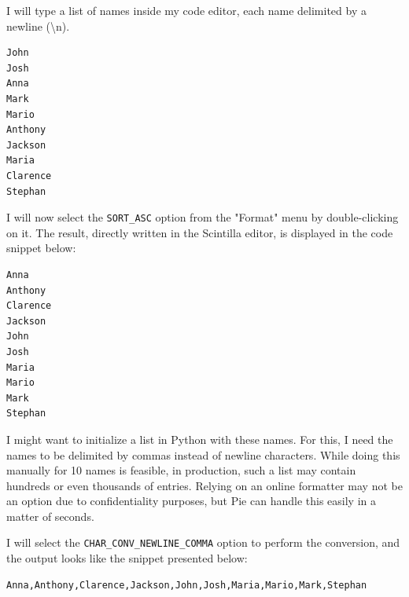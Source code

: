I will type a list of names inside my code editor, each name delimited by a newline (\textbackslash n).

\begin{lstlisting}[caption={List of random names that is going to be processed by Pie's formatting algorithms}]
John
Josh
Anna
Mark
Mario
Anthony
Jackson
Maria
Clarence
Stephan
\end{lstlisting}

I will now select the \texttt{SORT\_ASC} option from the "Format" menu by double-clicking on it. The result, directly written in the Scintilla editor, is displayed in the code snippet below:

\begin{lstlisting}[caption={Output after sorting lines ascending}]
Anna
Anthony
Clarence
Jackson
John
Josh
Maria
Mario
Mark
Stephan
\end{lstlisting}

I might want to initialize a list in Python with these names. For this, I need the names to be delimited by commas instead of newline characters. While doing this manually for 10 names is feasible, in production, such a list may contain hundreds or even thousands of entries. Relying on an online formatter may not be an option due to confidentiality purposes, but Pie can handle this easily in a matter of seconds.

I will select the \texttt{CHAR\_CONV\_NEWLINE\_COMMA} option to perform the conversion, and the output looks like the snippet presented below:

\begin{lstlisting}[caption={Output after converting newline characters to comma}]
Anna,Anthony,Clarence,Jackson,John,Josh,Maria,Mario,Mark,Stephan
\end{lstlisting}